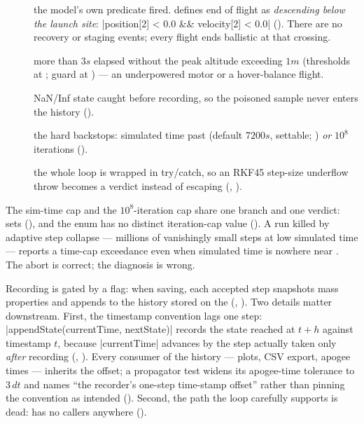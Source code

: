 \begin{description}
  \item[] the model's own predicate fired.  defines end of flight
    as \emph{descending below the launch site}: \cppinline|position[2] < 0.0 && velocity[2] < 0.0|
    (). There are no recovery or staging events; every flight ends
    ballistic at that crossing.
  \item[] more than $3\unit{s}$ elapsed without the peak altitude exceeding
    $1\unit{m}$ (thresholds at ; guard at
    ) --- an underpowered motor or a hover-balance flight.
  \item[] NaN/Inf state caught before recording, so the poisoned sample never
    enters the history ().
  \item[] the hard backstops: simulated time past 
    (default $7200\unit{s}$, settable; ) \emph{or} $10^{8}$ iterations
    ().
  \item[] the whole loop is wrapped in try/catch, so an RKF45 step-size
    underflow throw becomes a verdict instead of escaping (,
    ).
\end{description}

\begin{hardfail}
The sim-time cap and the $10^{8}$-iteration cap share one branch and one verdict:
 sets
 (), and the enum has no distinct
iteration-cap value (). A run killed by adaptive step collapse ---
millions of vanishingly small steps at low simulated time --- reports a time-cap exceedance even
when simulated time is nowhere near . The abort is correct; the diagnosis is
wrong. \fail
\end{hardfail}

Recording is gated by a  flag: when saving, each accepted step snapshots mass
properties and appends  to the history stored on the 
(, ). Two details matter downstream.
First, the timestamp convention lags one step: \cppinline|appendState(currentTime, nextState)|
records the state reached at $t+h$ against timestamp $t$, because \cppinline|currentTime| advances
by the step actually taken only \emph{after} recording (,
). Every consumer of the history --- plots, CSV export, apogee times
--- inherits the offset; a propagator test widens its apogee-time tolerance to $3\,dt$ and names
``the recorder's one-step time-stamp offset'' rather than pinning the convention as intended
(). Second, the  path the loop
carefully supports is dead:  has no callers anywhere
().

